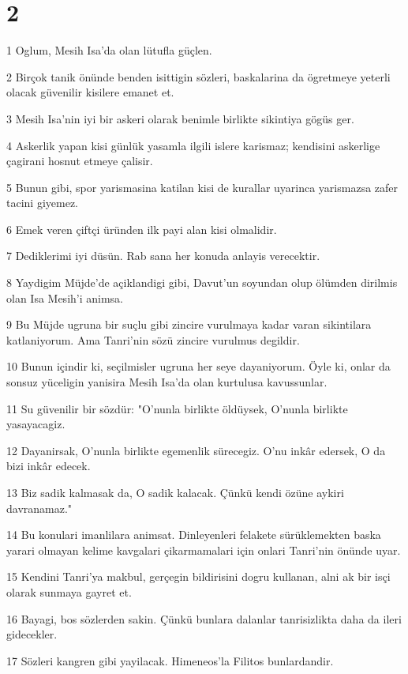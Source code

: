 \chapter{2}

\par 1 Oglum, Mesih Isa'da olan lütufla güçlen.
\par 2 Birçok tanik önünde benden isittigin sözleri, baskalarina da ögretmeye yeterli olacak güvenilir kisilere emanet et.
\par 3 Mesih Isa'nin iyi bir askeri olarak benimle birlikte sikintiya gögüs ger.
\par 4 Askerlik yapan kisi günlük yasamla ilgili islere karismaz; kendisini askerlige çagirani hosnut etmeye çalisir.
\par 5 Bunun gibi, spor yarismasina katilan kisi de kurallar uyarinca yarismazsa zafer tacini giyemez.
\par 6 Emek veren çiftçi üründen ilk payi alan kisi olmalidir.
\par 7 Dediklerimi iyi düsün. Rab sana her konuda anlayis verecektir.
\par 8 Yaydigim Müjde'de açiklandigi gibi, Davut'un soyundan olup ölümden dirilmis olan Isa Mesih'i animsa.
\par 9 Bu Müjde ugruna bir suçlu gibi zincire vurulmaya kadar varan sikintilara katlaniyorum. Ama Tanri'nin sözü zincire vurulmus degildir.
\par 10 Bunun içindir ki, seçilmisler ugruna her seye dayaniyorum. Öyle ki, onlar da sonsuz yüceligin yanisira Mesih Isa'da olan kurtulusa kavussunlar.
\par 11 Su güvenilir bir sözdür: "O'nunla birlikte öldüysek, O'nunla birlikte yasayacagiz.
\par 12 Dayanirsak, O'nunla birlikte egemenlik sürecegiz. O'nu inkâr edersek, O da bizi inkâr edecek.
\par 13 Biz sadik kalmasak da, O sadik kalacak. Çünkü kendi özüne aykiri davranamaz."
\par 14 Bu konulari imanlilara animsat. Dinleyenleri felakete sürüklemekten baska yarari olmayan kelime kavgalari çikarmamalari için onlari Tanri'nin önünde uyar.
\par 15 Kendini Tanri'ya makbul, gerçegin bildirisini dogru kullanan, alni ak bir isçi olarak sunmaya gayret et.
\par 16 Bayagi, bos sözlerden sakin. Çünkü bunlara dalanlar tanrisizlikta daha da ileri gidecekler.
\par 17 Sözleri kangren gibi yayilacak. Himeneos'la Filitos bunlardandir.

